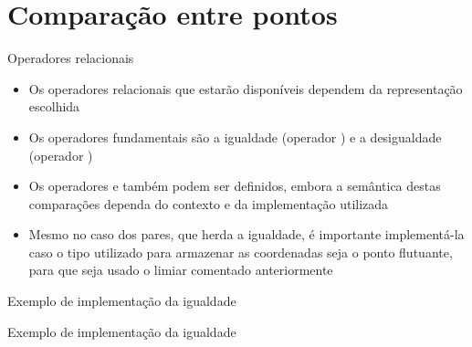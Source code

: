 \section{Comparação entre pontos}

\begin{frame}[fragile]{Operadores relacionais}

    \begin{itemize}
        \item Os operadores relacionais que estarão disponíveis dependem da representação
            escolhida
        \pause

        \item Os operadores fundamentais são a igualdade (operador ) e a 
            desigualdade (operador )
        \pause

        \item Os operadores  e  também podem ser definidos, embora a 
            semântica destas comparações dependa do contexto e da implementação utilizada
        \pause

        \item Mesmo no caso dos pares, que herda a igualdade, é importante implementá-la caso
            o tipo utilizado para armazenar as coordenadas seja o ponto flutuante, para que
            seja usado o limiar comentado anteriormente
   \end{itemize}

\end{frame}

\begin{frame}[fragile]{Exemplo de implementação da igualdade}
\end{frame}

\begin{frame}[fragile]{Exemplo de implementação da igualdade}
\end{frame}
